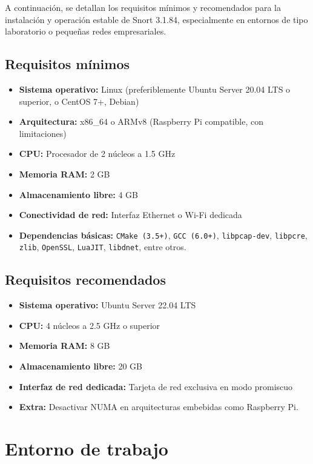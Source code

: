 \documentclass[11pt,a4paper,twoside]{report}
\begin{document}
A continuación, se detallan los requisitos mínimos y recomendados para la instalación y operación estable de Snort 3.1.84, especialmente en entornos de tipo laboratorio o pequeñas redes empresariales.

\subsection*{Requisitos mínimos}

\begin{itemize}
	\item \textbf{Sistema operativo:} Linux (preferiblemente Ubuntu Server 20.04 LTS o superior, o CentOS 7+, Debian)
	\item \textbf{Arquitectura:} x86\_64 o ARMv8 (Raspberry Pi compatible, con limitaciones)
	\item \textbf{CPU:} Procesador de 2 núcleos a 1.5 GHz
	\item \textbf{Memoria RAM:} 2 GB
	\item \textbf{Almacenamiento libre:} 4 GB
	\item \textbf{Conectividad de red:} Interfaz Ethernet o Wi-Fi dedicada
	\item \textbf{Dependencias básicas:} \texttt{CMake (3.5+)}, \texttt{GCC (6.0+)}, \texttt{libpcap-dev}, \texttt{libpcre}, \texttt{zlib}, \texttt{OpenSSL}, \texttt{LuaJIT}, \texttt{libdnet}, entre otros.
\end{itemize}

\subsection*{Requisitos recomendados}

\begin{itemize}
	\item \textbf{Sistema operativo:} Ubuntu Server 22.04 LTS
	\item \textbf{CPU:} 4 núcleos a 2.5 GHz o superior
	\item \textbf{Memoria RAM:} 8 GB
	\item \textbf{Almacenamiento libre:} 20 GB
	\item \textbf{Interfaz de red dedicada:} Tarjeta de red exclusiva en modo promiscuo
	\item \textbf{Extra:} Desactivar NUMA en arquitecturas embebidas como Raspberry Pi.
\end{itemize}

\section{Entorno de trabajo}
\end{document}
